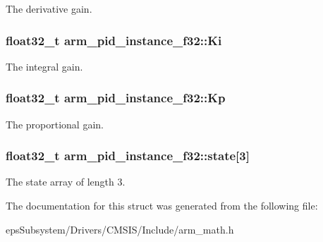 The derivative gain. \hypertarget{structarm__pid__instance__f32_ac0feffde05fe391eeab3bf78e953830a}{
\subsubsection[{Ki}]{\setlength{\rightskip}{0pt plus 5cm}float32\-\_\-t arm\-\_\-pid\-\_\-instance\-\_\-f32\-::\-Ki}}\label{structarm__pid__instance__f32_ac0feffde05fe391eeab3bf78e953830a}
The integral gain. \hypertarget{structarm__pid__instance__f32_aa9b9aa9e413c6cec376a9dddc9f01ebe}{
\subsubsection[{Kp}]{\setlength{\rightskip}{0pt plus 5cm}float32\-\_\-t arm\-\_\-pid\-\_\-instance\-\_\-f32\-::\-Kp}}\label{structarm__pid__instance__f32_aa9b9aa9e413c6cec376a9dddc9f01ebe}
The proportional gain. \hypertarget{structarm__pid__instance__f32_afd394e1e52fb1d526aa472c83b8f2464}{
\subsubsection[{state}]{\setlength{\rightskip}{0pt plus 5cm}float32\-\_\-t arm\-\_\-pid\-\_\-instance\-\_\-f32\-::state\mbox{[}3\mbox{]}}}\label{structarm__pid__instance__f32_afd394e1e52fb1d526aa472c83b8f2464}
The state array of length 3. 

The documentation for this struct was generated from the following file\-:\begin{DoxyCompactItemize}
\item 
eps\-Subsystem/\-Drivers/\-C\-M\-S\-I\-S/\-Include/arm\-\_\-math.\-h\end{DoxyCompactItemize}
